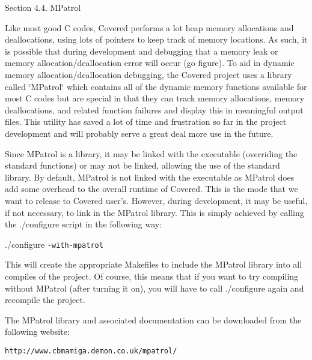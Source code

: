 \begin{Desc}
\item[Section 4.4. MPatrol]\end{Desc}
\begin{Desc}
\item[]Like most good C codes, Covered performs a lot heap memory allocations and deallocations, using lots of pointers to keep track of memory locations. As such, it is possible that during development and debugging that a memory leak or memory allocation/deallocation error will occur (go figure). To aid in dynamic memory allocation/deallocation debugging, the Covered project uses a library called \char`\"{}MPatrol\char`\"{} which contains all of the dynamic memory functions available for most C codes but are special in that they can track memory allocations, memory deallocations, and related function failures and display this in meaningful output files. This utility has saved a lot of time and frustration so far in the project development and will probably serve a great deal more use in the future.\end{Desc}
\begin{Desc}
\item[]Since MPatrol is a library, it may be linked with the executable (overriding the standard functions) or may not be linked, allowing the use of the standard library. By default, MPatrol is not linked with the executable as MPatrol does add some overhead to the overall runtime of Covered. This is the mode that we want to release to Covered user's. However, during development, it may be useful, if not necessary, to link in the MPatrol library. This is simply achieved by calling the {\tt }./configure script in the following way:\end{Desc}
\begin{Desc}
\item[]{\tt }./configure {\tt -with-mpatrol} \end{Desc}
\begin{Desc}
\item[]This will create the appropriate Makefiles to include the MPatrol library into all compiles of the project. Of course, this means that if you want to try compiling without MPatrol (after turning it on), you will have to call {\tt }./configure again and recompile the project.\end{Desc}
\begin{Desc}
\item[]The MPatrol library and associated documentation can be downloaded from the following website:\end{Desc}
\begin{Desc}
\item[]{\tt http://www.cbmamiga.demon.co.uk/mpatrol/}\end{Desc}




